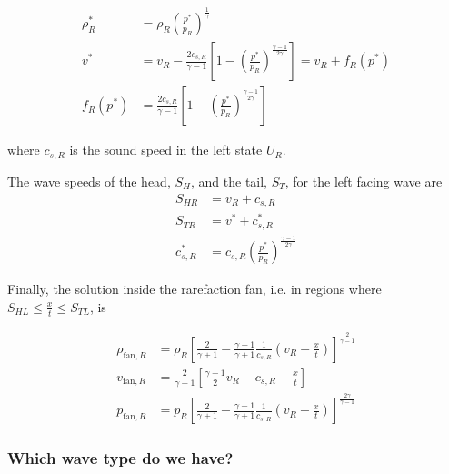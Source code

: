 \begin{align}
	\rho^*_R &=
		\rho_R \left( \frac{p^*}{p_R} \right) ^ \frac{1}{\gamma}\\
	v^* &=
		v_R - \frac{2 c_{s,R}}{\gamma - 1} \left[ 1 - \left( \frac{p^*}{p_R} \right) ^ \frac{\gamma
- 1}{2 \gamma}  \right]
		= v_R + f_R(p^*)
    \label{eq:velocity-rarefaction-right}
\\
    f_R(p^*) &= \frac{2 c_{s,R}}{\gamma - 1} \left[ 1 - \left( \frac{p^*}{p_R} \right) ^
\frac{\gamma -
1}{2 \gamma}  \right]
\end{align}

where $c_{s,R}$ is the sound speed in the left state $U_R$.


The wave speeds of the head, $S_H$, and the tail, $S_T$, for the left facing wave are
\begin{align}
	S_{HR} &= v_R + c_{s,R}\\
	S_{TR} &= v^* + c^*_{s,R}\\
	c^*_{s,R}  &= c_{s,R} \left( \frac{p^*}{p_R} \right) ^ \frac{\gamma - 1}{2 \gamma}
\end{align}




Finally, the solution inside the rarefaction fan, i.e. in regions where $S_{HL} \leq \frac{x}{t}
\leq S_{TL}$, is

\begin{align}
	\rho_{\text{fan}, R} &=
		\rho_R \left[ \frac{2}{\gamma + 1} - \frac{\gamma - 1}{\gamma + 1} \frac{1}{c_{s,R}}
\left(v_R - \frac{x}{t}\right) \right] ^ \frac{2}{\gamma -1 } \label{eq:rho-rarefaction-fan-right}
\\
	v_{\text{fan}, R} &=
		\frac{2}{\gamma + 1} \left[ \frac{\gamma - 1}{2} v_R - c_{s,R} + \frac{x}{t}  \right]
    \label{eq:velocity-rarefaction-fan-right}
\\
	p_{\text{fan}, R} &=
		p_R \left[ \frac{2}{\gamma + 1} - \frac{\gamma - 1}{\gamma + 1} \frac{1}{c_{s,R}} \left(v_R
- \frac{x}{t}\right) \right] ^ \frac{2 \gamma}{\gamma -1} \label{eq:pressure-rarefaction-fan-right}
\end{align}











\subsubsection{Which wave type do we have?}


